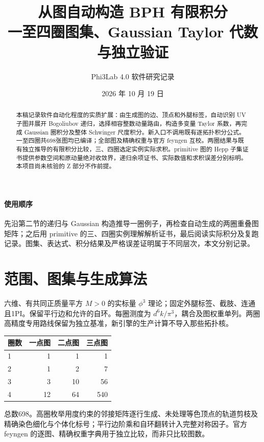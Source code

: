 \documentclass[UTF8,a4paper,11pt,fontset=fandol]{ctexart}
\title{从图自动构造 BPH 有限积分\\\large 一至四圈图集、Gaussian Taylor 代数与独立验证}
\author{Phi3Lab 4.0 软件研究记录}
\date{2026 年 10 月 19 日}
\begin{document}
\pagestyle{plain}\maketitle
\begin{abstract}
本稿记录软件自动化程度的实质扩展：由生成图的边、顶点和外腿标签，自动识别 UV 子图并展开 Bogoliubov 递归，选择相容整数动量路由，构造多变量 Taylor 系数，再完成 Gaussian 圈积分及整体 Schwinger 尺度积分。新入口不调用既有逐拓扑积分公式。一至四圈共698张图均已编译；全部图及精确权重与官方 feyngen 互校。两圈结果与既有独立推导的有限积分比较，三、四圈选定实例实际求积。primitive 图的 Hepp 子集证书提供参数空间和原动量绝对收敛界，递归余项证书、实际数值和求积误差分别标明。本项目尚未核验的 Z 部分不作前提。
\end{abstract}
\paragraph{使用顺序}
先沿第二节的递归与 Gaussian 构造推导一圈例子，再检查自动生成的两圈重叠图矩阵；之后用 primitive 的三、四圈实例理解解析证书，最后阅读实际积分及复跑记录。图集、表达式、积分结果及严格误差证明属于不同层次，本文分别记录。
\setcounter{tocdepth}{1}
\tableofcontents\clearpage
\section{范围、图集与生成算法}
六维、有共同正质量平方 $M>0$ 的实标量 $\phi^3$ 理论；固定外腿标签、截肢、连通且1PI。保留平行边和允许的自环。每圈测度为 $d^6k/\pi^3$，耦合及图权重单列。两圈高精度专用路线保留为独立基准，新引擎的生产计算不导入那些拓扑核。
\begin{center}\begin{tabular}{lrrr}\toprule
圈数 & 一点图 & 二点图 & 三点图\\\midrule
1&1&1&1\\2&1&2&7\\3&3&10&56\\4&12&64&540\\\bottomrule
\end{tabular}\end{center}
总数698。高圈枚举用度约束的邻接矩阵逐行生成、未处理等色顶点的轨道剪枝及精确染色细化与个体化标号；平行边阶乘和自环翻转计入完整对称因子。官方 feyngen 的逐图、精确权重字典用于独立比较，而非只比较图数。


\clearpage


\clearpage
\clearpage
\end{document}
